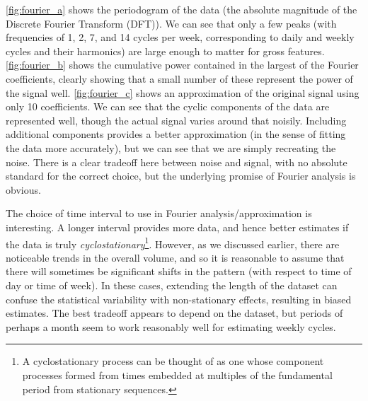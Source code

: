 \autoref{fig:fourier_a} shows the periodogram of the data
(the absolute magnitude of the Discrete Fourier Transform (DFT)). We
can see that only a few peaks (with frequencies of 1, 2, 7, and 14
cycles per week, corresponding to daily and weekly cycles and their
harmonics) are large enough to matter for gross features.
\autoref{fig:fourier_b} shows the cumulative power contained in the
largest of the Fourier coefficients, clearly showing that a small
number of these represent the power of the signal
well. \autoref{fig:fourier_c} shows an approximation of the original
signal using only 10 coefficients. We can see that the cyclic
components of the data are represented well, though the actual signal
varies around that noisily. Including additional components provides a
better approximation (in the sense of fitting the data more
accurately), but we can see that we are simply recreating the
noise. There is a clear tradeoff here between noise and signal, with
no absolute standard for the correct choice, but the underlying
promise of Fourier analysis is obvious.

The choice of time interval to use in Fourier analysis/approximation
is interesting. A longer interval provides more data, and hence better
estimates if the data is truly {\em cyclostationary}\footnote{A
  cyclostationary process can be thought of as one whose component
  processes formed from times embedded at multiples of the fundamental
  period from stationary sequences.}. However, as we discussed earlier, 
  there are noticeable
trends in the overall volume, and so it is reasonable to assume that
there will sometimes be significant shifts in the pattern (with
respect to time of day or time of week). In these cases, extending the
length of the dataset can confuse the statistical variability with
non-stationary effects, resulting in biased estimates. The best
tradeoff appears to depend on the dataset, but periods of perhaps a
month seem to work reasonably well for estimating weekly cycles. 

